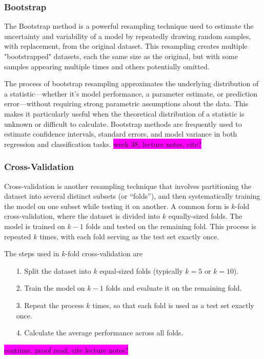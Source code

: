 \documentclass[aps,pra,english,notitlepage,reprint,nofootinbib]{revtex4-1}  %
\begin{document}
\subsubsection{Bootstrap}
The Bootstrap method is a powerful resampling technique used to estimate the uncertainty and variability of a model by repeatedly drawing random samples, with replacement, from the original dataset. This resampling creates multiple "bootstrapped" datasets, each the same size as the original, but with some samples appearing multiple times and others potentially omitted.

The process of bootstrap resampling approximates the underlying distribution of a statistic—whether it's model performance, a parameter estimate, or prediction error—without requiring strong parametric assumptions about the data. This makes it particularly useful when the theoretical distribution of a statistic is unknown or difficult to calculate. Bootstrap methods are frequently used to estimate confidence intervals, standard errors, and model variance in both regression and classification tasks. \colorbox{magenta}{week 38, lecture notes, cite?}


\subsubsection{Cross-Validation}
Cross-validation is another resampling technique that involves partitioning the dataset into several distinct subsets (or ``folds''), and then systematically training the model on one subset while testing it on another. A common form is $k$-fold cross-validation, where the dataset is divided into $k$ equally-sized folds. The model is trained on $k-1$ folds and tested on the remaining fold. This process is repeated $k$ times, with each fold serving as the test set exactly once.

The steps used in $k$-fold cross-validation are
\begin{enumerate}
  \item [1.] Split the dataset into $k$ equal-sized folds (typically $k=5$ or $k=10$). 
  \item [2.] Train the model on $k-1$ folds and evaluate it on the remaining fold.
  \item [3.] Repeat the process $k$ times, so that each fold is used as a test set exactly once.
  \item [4.] Calculate the average performance across all folds.
\end{enumerate}
\colorbox{magenta}{continue, proof read, cite lecture notes?}
\end{document}
